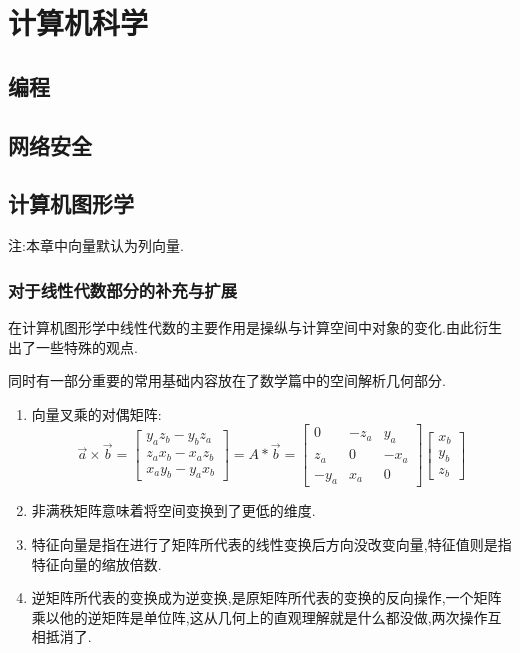 \documentclass[UTF8,12pt]{ctexbook}
\begin{document}
{{}%

\chapter{计算机科学}{

  \section{编程}{


   }%

  \section{网络安全}{


   }%

  \section{计算机图形学}{
    注:本章中向量默认为列向量.

    \subsection{对于线性代数部分的补充与扩展}{

      在计算机图形学中线性代数的主要作用是操纵与计算空间中对象的变化.由此衍生出了一些特殊的观点.

      同时有一部分重要的常用基础内容放在了数学篇中的空间解析几何部分.

      \begin{enumerate}
        \item {向量叉乘的对偶矩阵:
              $$\vec{a} \times \vec{b}
                =
                \begin{bmatrix}
                  y_az_b - y_bz_a \\
                  z_ax_b - x_az_b \\
                  x_ay_b - y_ax_b
                \end{bmatrix}
                =
                A * \vec{b}
                =
                \begin{bmatrix}
                  0    & -z_a & y_a  \\
                  z_a  & 0    & -x_a \\
                  -y_a & x_a  & 0
                \end{bmatrix}
                \begin{bmatrix}
                  x_b \\
                  y_b \\
                  z_b
                \end{bmatrix}
              $$
              }
        \item 非满秩矩阵意味着将空间变换到了更低的维度.
        \item 特征向量是指在进行了矩阵所代表的线性变换后方向没改变向量,特征值则是指特征向量的缩放倍数.
        \item 逆矩阵所代表的变换成为逆变换,是原矩阵所代表的变换的反向操作,一个矩阵乘以他的逆矩阵是单位阵,这从几何上的直观理解就是什么都没做,两次操作互相抵消了.
      \end{enumerate}
    }

}}}
\end{document}
